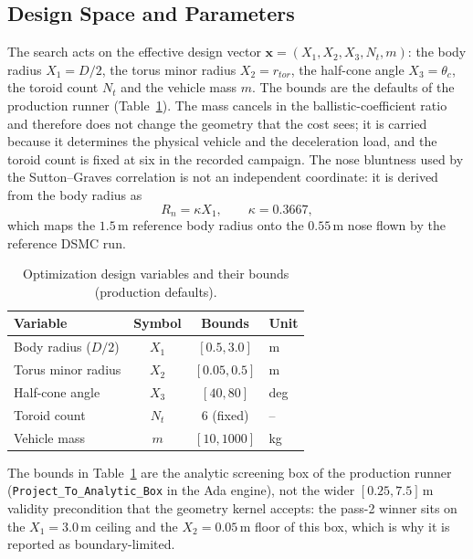 \subsection{Design Space and Parameters}
The search acts on the effective design vector $\mathbf{x}=(X_1,X_2,X_3,N_t,m)$: the body radius $X_1=D/2$, the torus minor radius $X_2=r_{tor}$, the half-cone angle $X_3=\theta_c$, the toroid count $N_t$ and the vehicle mass $m$. The bounds are the defaults of the production runner (Table~\ref{tab:design_variables}). The mass cancels in the ballistic-coefficient ratio and therefore does not change the geometry that the cost sees; it is carried because it determines the physical vehicle and the deceleration load, and the toroid count is fixed at six in the recorded campaign. The nose bluntness used by the Sutton--Graves correlation is not an independent coordinate: it is derived from the body radius as
\begin{equation}
    R_n = \kappa X_1, \qquad \kappa = 0.3667,
    \label{eq:nose_ratio}
\end{equation}
which maps the $1.5$\,m reference body radius onto the $0.55$\,m nose flown by the reference DSMC run.

\begin{table}[H]
    \centering
    \caption{Optimization design variables and their bounds (production defaults).}
    \label{tab:design_variables}
    \begin{tabularx}{\textwidth}{|>{\RaggedRight\arraybackslash}p{}|c|c|X|}
        \hline
        \textbf{Variable} & \textbf{Symbol} & \textbf{Bounds} & \textbf{Unit} \\ \hline
        Body radius ($D/2$) & $X_1$ & $[0.5, 3.0]$ & m \\ \hline
        Torus minor radius & $X_2$ & $[0.05, 0.5]$ & m \\ \hline
        Half-cone angle & $X_3$ & $[40, 80]$ & deg \\ \hline
        Toroid count & $N_t$ & 6 (fixed) & -- \\ \hline
        Vehicle mass & $m$ & $[10, 1000]$ & kg \\ \hline
    \end{tabularx}
\end{table}
The bounds in Table~\ref{tab:design_variables} are the analytic screening box of the production runner (\texttt{Project\_To\_Analytic\_Box} in the Ada engine), not the wider $[0.25, 7.5]$\,m validity precondition that the geometry kernel accepts: the pass-2 winner sits on the $X_1=3.0$\,m ceiling and the $X_2=0.05$\,m floor of this box, which is why it is reported as boundary-limited.

